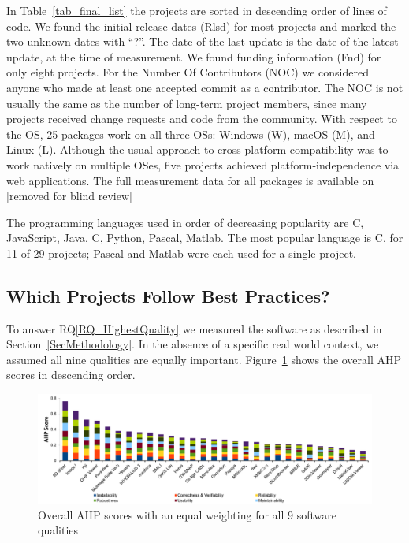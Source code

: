 \documentclass[final, 12pt, 3p, times]{elsarticle}
\newcommand{\rqref}[1]{RQ\ref{#1}}
\newcommand{\CC}{C\nolinebreak\hspace{-.05em}\raisebox{.4ex}{\small\bf
+}\nolinebreak\hspace{-.10em}\raisebox{.4ex}{\small\bf +}}
\begin{document}
In Table~\ref{tab_final_list} the projects are sorted in descending order of
lines of code.  We found the initial release dates (Rlsd) for most projects and
marked the two unknown dates with ``?''. The date of the last update is the date
of the latest update, at the time of measurement. We found funding information
(Fnd) for only eight projects.  For the Number Of Contributors (NOC) we
considered anyone who made at least one accepted commit as a contributor. The
NOC is not usually the same as the number of long-term project members, since
many projects received change requests and code from the community.  With
respect to the OS, 25 packages work on all three OSs: Windows (W), macOS (M),
and Linux (L). Although the usual approach to cross-platform compatibility was
to work natively on multiple OSes, five projects achieved platform-independence
via web applications. The full measurement data for all packages is available on
[removed for blind review]

The programming languages used in order of decreasing popularity are \CC,
JavaScript, Java, C, Python, Pascal, Matlab.  The most popular language is \CC,
for 11 of 29 projects; Pascal and Matlab were each used for a single project.

\subsection{Which Projects Follow Best Practices?}

To answer \rqref{RQ_HighestQuality} we measured the software as described in
Section~\ref{SecMethodology}.  In the absence of a specific real world context,
we assumed all nine qualities are equally important.
Figure~\ref{fg_overall_scores} shows the overall AHP scores in descending order.

\begin{figure}[!ht]
\includegraphics[scale=0.47]{overall_scores.pdf}
\caption{Overall AHP scores with an equal weighting for all 9 software qualities}

\label{fg_overall_scores}
\end{figure}
\end{document}
